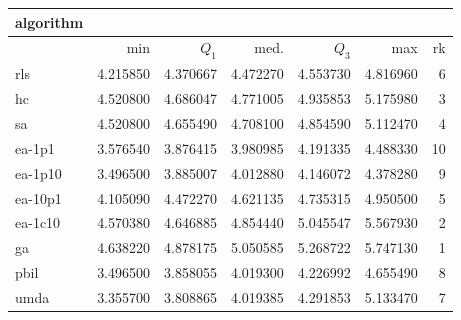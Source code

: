 \begin{tabular}{@{}l*{5}{>{{}}N{1}{2}}>{{}}N{2}{0}@{}}
\toprule
{algorithm} &  \\
\midrule
& {min} & {$Q_1$} & {med.} & {$Q_3$} & {max} & {rk}\\
\midrule
rls & 4.215850 & 4.370667 & 4.472270 & 4.553730 & 4.816960 & 6\\
hc & 4.520800 & 4.686047 & 4.771005 & 4.935853 & 5.175980 & 3\\
sa & 4.520800 & 4.655490 & 4.708100 & 4.854590 & 5.112470 & 4\\
ea-1p1 & 3.576540 & 3.876415 & 3.980985 & 4.191335 & 4.488330 & 10\\
ea-1p10 & 3.496500 & 3.885007 & 4.012880 & 4.146072 & 4.378280 & 9\\
ea-10p1 & 4.105090 & 4.472270 & 4.621135 & 4.735315 & 4.950500 & 5\\
ea-1c10 & 4.570380 & 4.646885 & 4.854440 & 5.045547 & 5.567930 & 2\\
ga & {\color{blue}} 4.638220 & {\color{blue}} 4.878175 & {\color{blue}} 5.050585 & {\color{blue}} 5.268722 & {\color{blue}} 5.747130 & 1\\
pbil & 3.496500 & 3.858055 & 4.019300 & 4.226992 & 4.655490 & 8\\
umda & 3.355700 & 3.808865 & 4.019385 & 4.291853 & 5.133470 & 7\\
\bottomrule
\end{tabular}
